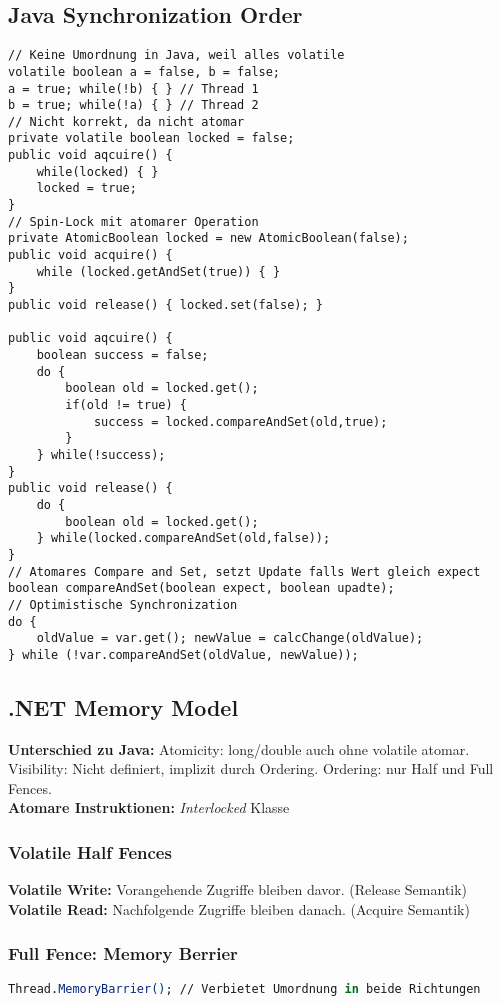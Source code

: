 \subsection{Java Synchronization Order}
\begin{lstlisting}
// Keine Umordnung in Java, weil alles volatile
volatile boolean a = false, b = false;
a = true; while(!b) { } // Thread 1 
b = true; while(!a) { } // Thread 2 
// Nicht korrekt, da nicht atomar 
private volatile boolean locked = false;
public void aqcuire() {
    while(locked) { }
    locked = true;
}
// Spin-Lock mit atomarer Operation
private AtomicBoolean locked = new AtomicBoolean(false);
public void acquire() {
    while (locked.getAndSet(true)) { }
}
public void release() { locked.set(false); }

public void aqcuire() {
    boolean success = false;
    do {
        boolean old = locked.get();
        if(old != true) {
            success = locked.compareAndSet(old,true);
        }
    } while(!success);
}
public void release() {
    do {
        boolean old = locked.get();
    } while(locked.compareAndSet(old,false));
}
// Atomares Compare and Set, setzt Update falls Wert gleich expect
boolean compareAndSet(boolean expect, boolean upadte); 
// Optimistische Synchronization
do {
    oldValue = var.get(); newValue = calcChange(oldValue);
} while (!var.compareAndSet(oldValue, newValue));
\end{lstlisting}

\subsection{.NET Memory Model}
\textbf{Unterschied zu Java:} Atomicity: long/double auch ohne volatile atomar.
Visibility: Nicht definiert, implizit durch Ordering.
Ordering: nur Half und Full Fences.\\ 
\textbf{Atomare Instruktionen:} \textit{Interlocked} Klasse

\subsubsection{Volatile Half Fences}
\textbf{Volatile Write:} Vorangehende Zugriffe bleiben davor. (Release Semantik)
\textbf{Volatile Read:} Nachfolgende Zugriffe bleiben danach. (Acquire Semantik)

\subsubsection{Full Fence: Memory Berrier}
\begin{lstlisting}[language=csh]
Thread.MemoryBarrier(); // Verbietet Umordnung in beide Richtungen
\end{lstlisting}